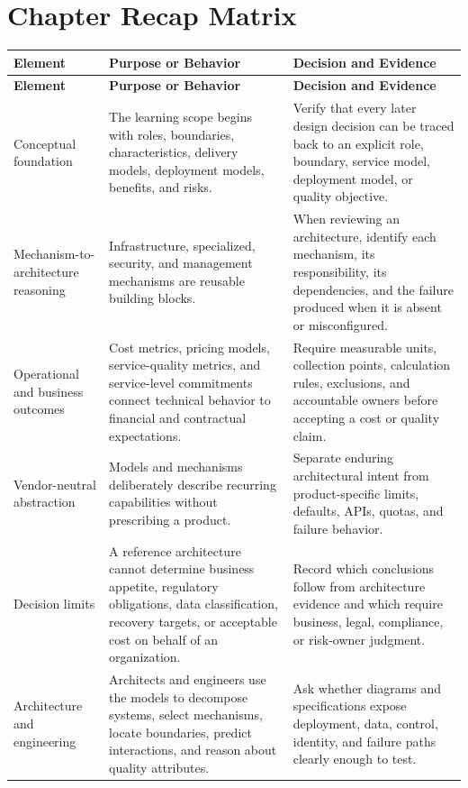 \documentclass[11pt]{article}
\begin{document}
\section{Chapter Recap Matrix}
\begingroup\small\setlength{\tabcolsep}{4pt}
\begin{longtable}{@{}>{\RaggedRight\arraybackslash}p{}>{\RaggedRight\arraybackslash}p{}>{\RaggedRight\arraybackslash}p{}@{}}
\toprule\rowcolor{Navy}\color{white}\textbf{Element} & \color{white}\textbf{Purpose or Behavior} & \color{white}\textbf{Decision and Evidence}\\\midrule\endfirsthead
\toprule\rowcolor{Navy}\color{white}\textbf{Element} & \color{white}\textbf{Purpose or Behavior} & \color{white}\textbf{Decision and Evidence}\\\midrule\endhead
Conceptual foundation & The learning scope begins with roles, boundaries, characteristics, delivery models, deployment models, benefits, and risks. & Verify that every later design decision can be traced back to an explicit role, boundary, service model, deployment model, or quality objective. \\\midrule
Mechanism-to-architecture reasoning & Infrastructure, specialized, security, and management mechanisms are reusable building blocks. & When reviewing an architecture, identify each mechanism, its responsibility, its dependencies, and the failure produced when it is absent or misconfigured. \\\midrule
Operational and business outcomes & Cost metrics, pricing models, service-quality metrics, and service-level commitments connect technical behavior to financial and contractual expectations. & Require measurable units, collection points, calculation rules, exclusions, and accountable owners before accepting a cost or quality claim. \\\midrule
Vendor-neutral abstraction & Models and mechanisms deliberately describe recurring capabilities without prescribing a product. & Separate enduring architectural intent from product-specific limits, defaults, APIs, quotas, and failure behavior. \\\midrule
Decision limits & A reference architecture cannot determine business appetite, regulatory obligations, data classification, recovery targets, or acceptable cost on behalf of an organization. & Record which conclusions follow from architecture evidence and which require business, legal, compliance, or risk-owner judgment. \\\midrule
Architecture and engineering & Architects and engineers use the models to decompose systems, select mechanisms, locate boundaries, predict interactions, and reason about quality attributes. & Ask whether diagrams and specifications expose deployment, data, control, identity, and failure paths clearly enough to test. \\\midrule

\end{longtable}
\end{document}
